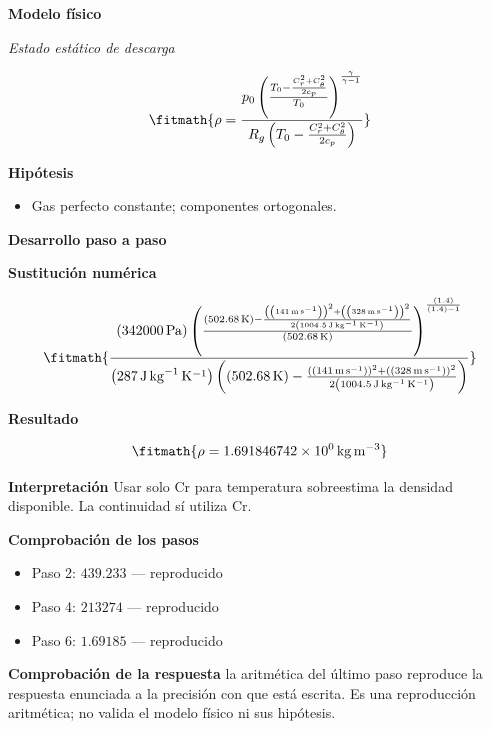 \documentclass[10pt,openany]{book}
\begin{document}
\noindent\textbf{Modelo físico}

\noindent\textit{Estado estático de descarga}

\[
\fitmath{\rho=\frac{p_0 \left(\frac{T_0 - \frac{C_r^{2} + C_\theta^{2}}{2 c_p}}{T_0}\right)^{\frac{\gamma}{\gamma - 1}}}{R_g \left(T_0 - \frac{C_r^{2} + C_\theta^{2}}{2 c_p}\right)}}
\]

\noindent\textbf{Hipótesis}
\begin{itemize}
\item Gas perfecto constante; componentes ortogonales.
\end{itemize}

\noindent\textbf{Desarrollo paso a paso}



\noindent\textbf{Sustitución numérica}

\[
\fitmath{\frac{\left(342000\,\mathrm{Pa}\right) \left(\frac{\left(502.68\,\mathrm{K}\right) - \frac{\left(\left(141\,\mathrm{m}\,\mathrm{s}^{-1}\right)\right)^{2} + \left(\left(328\,\mathrm{m}\,\mathrm{s}^{-1}\right)\right)^{2}}{2 \left(1004.5\,\mathrm{J}\,\mathrm{kg}^{-1}\,\mathrm{K}^{-1}\right)}}{\left(502.68\,\mathrm{K}\right)}\right)^{\frac{\left(1.4\right)}{\left(1.4\right) - 1}}}{\left(287\,\mathrm{J}\,\mathrm{kg}^{-1}\,\mathrm{K}^{-1}\right) \left(\left(502.68\,\mathrm{K}\right) - \frac{\left(\left(141\,\mathrm{m}\,\mathrm{s}^{-1}\right)\right)^{2} + \left(\left(328\,\mathrm{m}\,\mathrm{s}^{-1}\right)\right)^{2}}{2 \left(1004.5\,\mathrm{J}\,\mathrm{kg}^{-1}\,\mathrm{K}^{-1}\right)}\right)}}
\]

\noindent\textbf{Resultado}

\[
\fitmath{\rho=1.691846742\times10^{0}\,\mathrm{kg}\,\mathrm{m}^{-3}}
\]

\noindent\textbf{Interpretación}
Usar solo Cr para temperatura sobreestima la densidad disponible. La continuidad sí utiliza Cr.

\noindent\textbf{Comprobación de los pasos}
\begin{itemize}
\item Paso 2: $439.233$ — reproducido
\item Paso 4: $213274$ — reproducido
\item Paso 6: $1.69185$ — reproducido
\end{itemize}

\noindent\textbf{Comprobación de la respuesta} la aritmética del último paso reproduce la respuesta enunciada a la precisión con que está escrita. Es una reproducción aritmética; no valida el modelo físico ni sus hipótesis.
\end{document}
